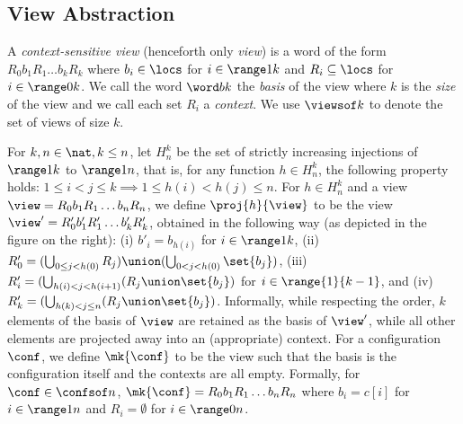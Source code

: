 \subsection{View Abstraction}
\label{section:abstraction}


A \emph{context-sensitive view} (henceforth only \emph{view}) is a
word of the form $R_0b_1R_1\ldots b_kR_k$ where $b_i\in\locs$ for
$i\in\range 1 k$ and $R_i \subseteq\locs$ for $i\in\range 0 k$. %
%
We call the word $\word b k$ the \emph{basis} of the view where $k$ is
the \emph{size} of the view and we call each set $R_i$ a
\emph{context}. %
We use $\viewsof k$ to denote the set of views of size $k$.


\begin{wrapfigure}{r}{0.32\textwidth}
  \vspace{-20pt}%
  \hfill%
  
  \vspace{-28pt}%
\end{wrapfigure}
%
For $k,n\in\nat, k\leq n$, let $H_n^k$ be the set of strictly
increasing injections of $\range 1 k$ to $\range 1 n$, that is, for
any function $h\in H_n^k$, the following property holds: $1\leq
i<j\leq k \implies 1\leq h(i)<h(j)\leq n$. %
%
For $h\in H_n^k$ and a view $\view =R_0b_1R_1\ldots b_nR_n$, we define
$\proj{h}{\view}$ to
be %
the view $\view' = R'_0b'_1R'_1\ldots b'_kR'_k$, obtained in the
following way (as depicted in the figure on the right):
%
(i) $b'_i=b_{h(i)}$ for $i\in\range 1 k$, %
(ii) $R'_0=(\bigcup_{0{\leq}j<h(0)}R_j)\union(\bigcup_{0<j<h(0)}\set{b_j})$, %
(iii) $R'_i=(\bigcup_{h(i)<j<h(i+1)}(R_j\union\set{b_j})$ for $i\in\range{1}{k-1}$, %
and (iv) $R'_k=(\bigcup_{h(k)<j{\leq}n}(R_j\union\set{b_j})$. %
%
Informally, while respecting the order, $k$ elements of the basis of
$\view$ are retained as the basis of $\view'$, while all other
elements are projected away into an (appropriate) context.
%
For a configuration $\conf$, we define $\mk{\conf}$ to be the view
such that the basis is the configuration itself and the contexts are
all empty. %
Formally, for $\conf\in\confsof n$, $\mk{\conf} = R_0b_1R_1\ldots
b_nR_n$ where $b_i=c[i]$ for $i\in\range 1 n$ and $R_i=\emptyset$ for
$i\in\range 0 n$.
%

